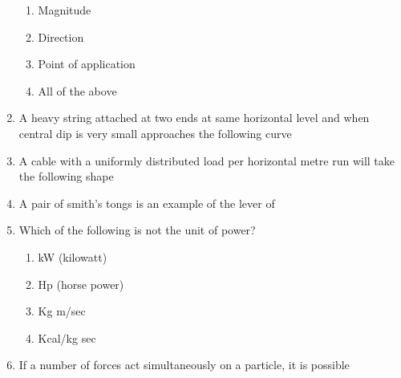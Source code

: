 \documentclass[11pt,a4paper]{article}
\begin{document}
\begin{enumerate}
\begin{enumerate}[label=\Alph*.]
\item{Magnitude}
\item{Direction}
\item{Point of application}
\item{All of the above}
\end{enumerate}
\item{A heavy string attached at two ends at same horizontal level and when central dip is very small approaches the following curve}
\\
\item{A cable with a uniformly distributed load per horizontal metre run will take the following shape}
\\
\item{A pair of smith's tongs is an example of the lever of
}
\\
\item{Which of the following is not the unit of power?}
\begin{enumerate}[label=\Alph*.]
\item{kW (kilowatt)}
\item{Hp (horse power)}
\item{Kg m/sec}
\item{Kcal/kg sec}
\end{enumerate}
\item{If a number of forces act simultaneously on a particle, it is possible}

\end{enumerate}
\end{document}

